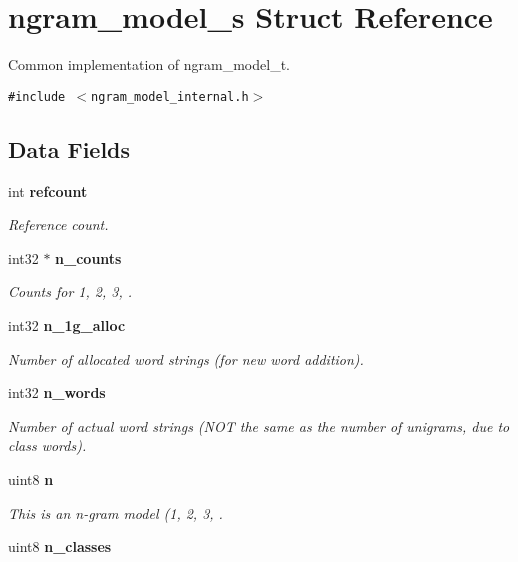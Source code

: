 \section{ngram\_\-model\_\-s Struct Reference}
\label{structngram__model__s}
Common implementation of ngram\_\-model\_\-t.  


{\tt \#include $<$ngram\_\-model\_\-internal.h$>$}

\subsection*{Data Fields}
\begin{CompactItemize}
\item 
int {\bf refcount}\label{structngram__model__s_3b14986e4dc40ccec1f7e206b7f41d06}

\begin{CompactList}\small\item\em Reference count. \item\end{CompactList}\item 
int32 $\ast$ {\bf n\_\-counts}
\begin{CompactList}\small\item\em Counts for 1, 2, 3, . \item\end{CompactList}\item 
int32 {\bf n\_\-1g\_\-alloc}\label{structngram__model__s_3e41109b30668bdfc077614c1ef49960}

\begin{CompactList}\small\item\em Number of allocated word strings (for new word addition). \item\end{CompactList}\item 
int32 {\bf n\_\-words}
\begin{CompactList}\small\item\em Number of actual word strings (NOT the same as the number of unigrams, due to class words). \item\end{CompactList}\item 
uint8 {\bf n}
\begin{CompactList}\small\item\em This is an n-gram model (1, 2, 3, . \item\end{CompactList}\item 
uint8 {\bf n\_\-classes}\label{structngram__model__s_deb914f8e9f011a5c960f5ee9cd33919}


\end{CompactItemize}

